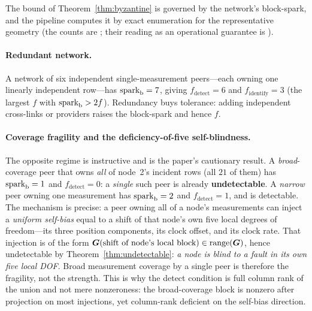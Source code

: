 The bound of Theorem~\ref{thm:byzantine} is governed by the network's block-spark, and the
pipeline computes it by exact enumeration for the representative geometry (the counts are
\Validated{}; their reading as an operational guarantee is \Modelled{}).

\paragraph{Redundant network.}
A network of six independent single-measurement peers---each owning one linearly independent
row---has $\operatorname{spark}_{\mathrm b}=7$, giving $f_{\mathrm{detect}}=6$ and $f_{\mathrm{identify}}=3$
(the largest $f$ with $\operatorname{spark}_{\mathrm b}>2f$). Redundancy buys tolerance: adding independent
cross-links or providers raises the block-spark and hence $f$.

\paragraph{Coverage fragility and the deficiency-of-five self-blindness.}
The opposite regime is instructive and is the paper's cautionary result. A \emph{broad}-%
coverage peer that owns \emph{all} of node~2's incident rows (all $21$ of them) has
$\operatorname{spark}_{\mathrm b}=1$ and $f_{\mathrm{detect}}=0$: a \emph{single} such peer is already
\textbf{undetectable}. A \emph{narrow} peer owning one measurement has $\operatorname{spark}_{\mathrm b}=2$
and $f_{\mathrm{detect}}=1$, and is detectable. The mechanism is precise: a peer owning all
of a node's measurements can inject a \emph{uniform self-bias} equal to a shift of that
node's own five local degrees of freedom---its three position components, its clock offset,
and its clock rate. That injection is of the form $\bm{G}(\text{shift of node's local
block})\in\operatorname{range}(\bm{G})$, hence undetectable by Theorem~\ref{thm:undetectable}: \emph{a node is
blind to a fault in its own five local DOF}. Broad measurement coverage by a single peer is
therefore the fragility, not the strength. This is why the detect condition is full column
rank of the union and not mere nonzeroness: the broad-coverage block is nonzero after
projection on most injections, yet column-rank deficient on the self-bias direction.

